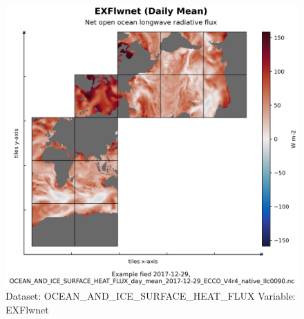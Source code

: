 \begin{figure}[H]
\centering
\includegraphics[scale=0.55]{../images/plots/native_plots/Ocean_and_Sea-Ice_Surface_Heat_Fluxes/EXFlwnet.png}
\caption{Dataset: OCEAN\_AND\_ICE\_SURFACE\_HEAT\_FLUX Variable: EXFlwnet}
\label{tab:table-OCEAN_AND_ICE_SURFACE_HEAT_FLUX_EXFlwnet-Plot}
\end{figure}
\pagebreak
